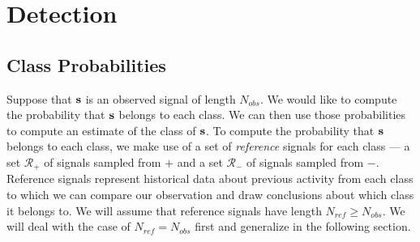 \section{Detection}
\subsection{Class Probabilities}
Suppose that $\mathbf s$ is an observed signal of length $N_{obs}$. We would like to
compute the probability that $\mathbf s$ belongs to each class. We can then use
those probabilities to compute an estimate of the class of $\mathbf s$.  To compute
the probability that $\mathbf s$ belongs to each class, we make use of a set of {\em
  reference} signals for each class --- a set $\mathcal{R}_+$ of signals sampled
from $+$ and a set $\mathcal{R}_-$ of signals sampled from $-$. Reference
signals represent historical data about previous activity from each class to
which we can compare our observation and draw conclusions about which class it
belongs to. We will assume that reference signals have length $N_{ref} \geq
N_{obs}$. We will deal with the case of $N_{ref} = N_{obs}$ first and generalize
in the following section.

